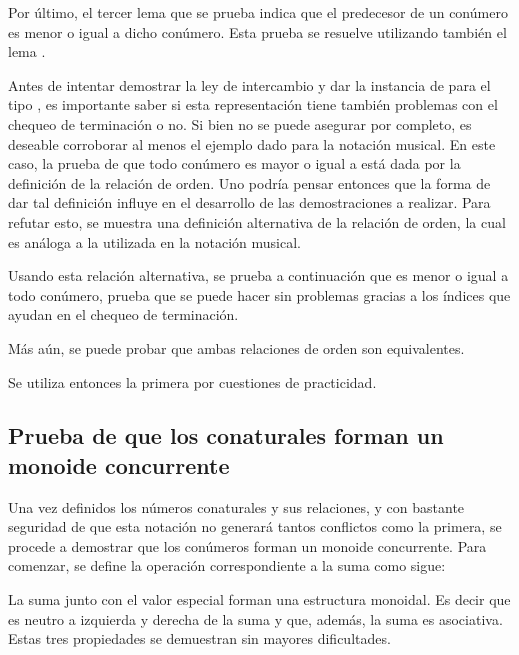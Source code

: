 Por último, el tercer lema que se prueba indica que el predecesor de un conúmero es menor o igual a dicho conúmero. Esta prueba se resuelve utilizando también el lema .

Antes de intentar demostrar la ley de intercambio y dar la instancia de  para el tipo , es importante saber si esta representación tiene también problemas con el chequeo de terminación o no. Si bien no se puede asegurar por completo, es deseable corroborar al menos el ejemplo dado para la notación musical. En este caso, la prueba de que todo conúmero es mayor o igual a  está dada por la definición de la relación de orden. Uno podría pensar entonces que la forma de dar tal definición influye en el desarrollo de las demostraciones a realizar. Para refutar esto, se muestra una definición alternativa de la relación de orden, la cual es análoga a la utilizada en la notación musical. 

Usando esta relación alternativa, se prueba a continuación que  es menor o igual a todo conúmero, prueba que se puede hacer sin problemas gracias a los índices que ayudan en el chequeo de terminación. 

Más aún, se puede probar que ambas relaciones de orden son equivalentes. 

Se utiliza entonces la primera por cuestiones de practicidad.

\subsection{Prueba de que los conaturales forman un monoide concurrente}\label{casodelay:sized:concurrent}

Una vez definidos los números conaturales y sus relaciones, y con bastante seguridad de que esta notación no generará tantos conflictos como la primera, se procede a demostrar que los conúmeros forman un monoide concurrente. Para comenzar, se define la operación correspondiente a la suma como sigue:

La suma junto con el valor especial  forman una estructura monoidal. Es decir que  es neutro a izquierda y derecha de la suma y que, además, la suma es asociativa. Estas tres propiedades se demuestran sin mayores dificultades.

